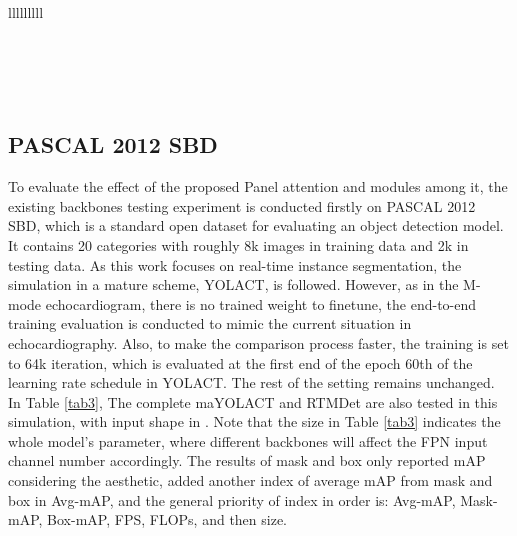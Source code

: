 \documentclass{article}
\begin{document}
\begin{table*}[!t]
{\begin{tabular}{lllllllll}
\\
\\
\\
\\
\\
\end{tabular}}
\end{table*}

\subsection{PASCAL 2012 SBD}
To evaluate the effect of the proposed Panel attention and modules among it, the existing backbones testing experiment is conducted firstly on PASCAL 2012 SBD, which is a standard open dataset for evaluating an object detection model. It contains 20 categories with roughly 8k images in training data and 2k in testing data. As this work focuses on real-time instance segmentation, the simulation in a mature scheme, YOLACT, is followed. However, as in the M-mode echocardiogram, there is no trained weight to finetune, the end-to-end training evaluation is conducted to mimic the current situation in echocardiography. Also, to make the comparison process faster, the training is set to 64k iteration, which is evaluated at the first end of the epoch 60th of the learning rate schedule in YOLACT. The rest of the setting remains unchanged. In Table \ref{tab3}, The complete maYOLACT and RTMDet are also tested in this simulation, with input shape in . Note that the size in Table \ref{tab3} indicates the whole model’s parameter, where different backbones will affect the FPN input channel number accordingly. The results of mask and box only reported mAP considering the aesthetic, added another index of average mAP from mask and box in Avg-mAP, and the general priority of index in order is: Avg-mAP, Mask-mAP, Box-mAP, FPS, FLOPs, and then size. 
\end{document}
